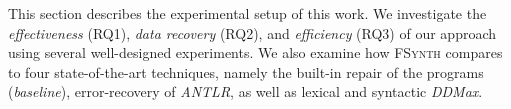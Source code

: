 \documentclass[sigconf,review,anonymous]{acmart}
\newcommand{\approach}{\textsc{FSynth}\xspace}
\newcommand{\ddmax}{\textit{DDMax}\xspace}
\newcommand{\brepair}{\textsc{FSynth}\xspace}
\begin{document}
This section describes the experimental setup of this work.
% 
%
We investigate the \textit{effectiveness} (RQ1), \textit{data recovery} (RQ2), 
and \textit{efficiency} (RQ3) of our approach using several well-designed experiments. %
We also examine how \approach compares to four state-of-the-art techniques, 
namely the built-in repair of the programs (\textit{baseline}), error-recovery of \textit{ANTLR}, as well as 
lexical and syntactic 
\ddmax.
\end{document}
